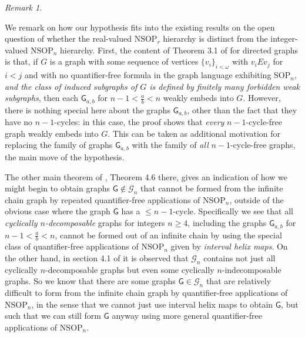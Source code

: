 \documentclass{amsart}
\theoremstyle{definition}
\theoremstyle{remark}
\newtheorem{remark}[theorem]{Remark}
\numberwithin{equation}{section}
\begin{document}
    \begin{remark}\label{comparison with existing results}

We remark on how our hypothesis fits into the existing results on the open question of whether the real-valued $\mathrm{NSOP}_{r}$ hierarchy is distinct from the integer-valued $\mathrm{NSOP}_{n}$ hierarchy. First, the content of Theorem 3.1 of \cite{ApproxOrder} for directed graphs is that, if $G$ is a graph with some sequence of vertices $\{v_{i}\}_{i < \omega}$ with $v_{i} E v_{j}$ for $i < j$ and with no quantifier-free formula in the graph language exhibiting $\mathrm{SOP}_{n}$, \textit{and the class of induced subgraphs of $G$ is defined by finitely many forbidden weak subgraphs}, then each $\mathsf{G}_{a, b}$ for $n -1 < \frac{a}{b} < n$ weakly embeds into $G$. However, there is nothing special here about the graphs $\mathsf{G}_{a, b}$, other than the fact that they have no $n-1$-cycles: in this case, the proof shows that \textit{every} $n-1$-cycle-free graph weakly embeds into $G$. This can be taken as additional motivation for replacing the family of graphs $\mathsf{G}_{a, b}$ with the family of \textit{all} $n-1$-cycle-free graphs, the main move of the hypothesis.

The other main theorem of \cite{ApproxOrder}, Theorem 4.6 there, gives an indication of how we might begin to obtain graphs $\mathsf{G} \notin \mathcal{G}_{n}$ that cannot be formed from the infinite chain graph by repeated quantifier-free applications of $\mathrm{NSOP}_{n}$, outside of the obvious case where the graph $\mathsf{G}$ has a $\leq n -1$-cycle. Specifically we see that all \textit{cyclically $n$-decomposable} graphs for integers $n \geq 4$, including the graphs $\mathsf{G}_{a, b}$ for $n -1 < \frac{a}{b} < n$, cannot be formed out of an infinite chain by using the special class of quantifier-free applications of $\mathrm{NSOP}_{n}$ given by \textit{interval helix maps}. On the other hand, in section 4.1 of \cite{ApproxOrder} it is observed that $\mathcal{G}_{n}$ contains not just all cyclically $n$-decomposable graphs but even some cyclically $n$-indecomposable graphs. So  we know that there are some graphs $\mathsf{G} \in \mathcal{G}_{n}$ that are relatively difficult to form from the infinite chain graph by quantifier-free applications of $\mathrm{NSOP}_{n}$, in the sense that we cannot just use interval helix maps to obtain $\mathsf{G}$, but such that we can still form $\mathsf{G}$ anyway using more general quantifier-free applications of $\mathrm{NSOP}_{n}$.


\end{remark}
\end{document}
